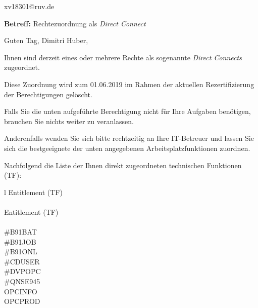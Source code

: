 \documentclass[a4paper,landscape,12pt]{letter}
\begin{document}
\begin{letter}{xv18301@ruv.de\hfill \break}
\begin{normalsize}
	\opening{\textbf{Betreff:} Rechtezuordnung als \emph{Direct Connect}}
	\begin{normalsize} \hfill
	\end{normalsize}

	\begin{normalsize}
		Guten Tag, 
	Dimitri Huber, \hfill \break
	\end{normalsize}
	\end{normalsize}
	
\begin{normalsize}
	Ihnen sind derzeit eines oder mehrere Rechte als sogenannte \emph{Direct Connects} zugeordnet.
	
	Diese Zuordnung wird zum 01.06.2019 im Rahmen der aktuellen Rezertifizierung der Berechtigungen gelöscht.
	
	Falls Sie die unten aufgeführte Berechtigung nicht für Ihre Aufgaben benötigen, 
	brauchen Sie nichts weiter zu veranlassen.
	
	Anderenfalls wenden Sie sich bitte rechtzeitig an Ihre IT-Betreuer 
	und lassen Sie sich die bestgeeignete der unten angegebenen Arbeitsplatzfunktionen zuordnen.
	\end{normalsize}
	
\begin{normalsize}
	Nachfolgend die Liste der Ihnen direkt zugeordneten technischen Funktionen (TF):

	\begin{longtable}{l}
		Entitlement (TF) \\ \hline
		\endfirsthead
		\\\hline
		Entitlement (TF) \\ \hline
		\endhead %
		\multicolumn{1}{r@{}}{Fortsetzung \ldots}\\
		\endfoot
		\hline
		\endlastfoot
	\#B91BAT\\\#B91JOB\\\#B91ONL\\\#CDUSER\\\#DVPOPC\\\#QNSE945\\OPCINFO\\OPCPROD\\
	\end{longtable}
	\end{normalsize}
	

\end{letter}
\end{document}
